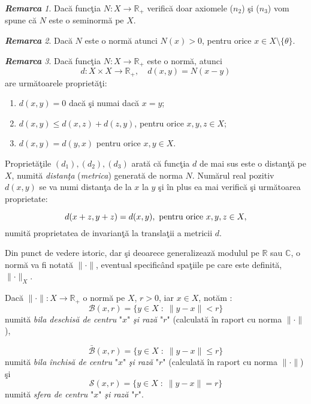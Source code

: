 \documentclass[ a4paper, 12pt]{report}
\theoremstyle{remark}
\newtheorem{remarc}{\bf Remarca}[section]
\numberwithin{equation}{section}
\begin{document}
\begin{remarc}
Dac\u a func\c tia $N : X \rightarrow \mathbb{R}_{+}$ verific\u a doar axiomele ($n_2$) \c si ($n_3$) vom spune c\u a $N$ este o seminorm\u a pe $X$.
\end{remarc}
\begin{remarc}
Dac\u a $N$ este o norm\u a atunci $N(x) > 0$, pentru orice $x \in X\setminus \{\theta\}$.
\end{remarc}
\begin{remarc}
Dac\u a func\c tia $N : X \rightarrow \mathbb{R}_{+}$ este  o norm\u a, atunci
$$d : X \times X \rightarrow \mathbb{R}_{+}, \quad
d(x,y) = N(x - y) $$ are urm\u atoarele propriet\u a\c ti:
\begin{enumerate}[($d_1$)]
\item $d(x,y) = 0$ dac\u a \c si numai dac\u a $x =y $;
\item $d(x,y) \leq d(x,z) + d(z,y)$, pentru orice $x,y,z \in X$;
\item $d(x,y) = d(y,x)$ pentru orice $x, y \in X$.
\end{enumerate}
Propriet\u a\c tile $(d_1),(d_2),(d_3)$ arat\u a c\u a func\c tia $d$ de mai sus este o distan\c t\u a pe $X$, numit\u a {\it distan\c ta} ({\it metrica}) generat\u a de norma $N$. Num\u arul real pozitiv
$d(x,y)$ se va numi distan\c ta de la $x$ la $y$ \c si \^in plus ea mai verific\u a \c si  urm\u atoarea proprietate:

$$d(x+z,y+z) = d(x,y), \hbox{ pentru orice } x,y,z \in X,$$ numit\u a proprietatea de invarian\c t\u a la transla\c tii a metricii $d$.
\end{remarc}

Din punct de vedere istoric, dar \c si deoarece  generalizeaz\u a modulul pe $\mathbb{R}$ sau $\mathbb{C}$, o norm\u a va fi notat\u a  $\lVert \cdot \rVert$, eventual specific\^and spa\c tiile pe care
este definit\u a, $\lVert \cdot \rVert_{X}$.

\smallskip

Dac\u a $\lVert \cdot \rVert : X \rightarrow \mathbb{R}_{+}$ o norm\u a pe $X$, $r>0$, iar $x \in X$, not\u am :
$$\mathcal{B}(x,r) = \{ y \in X \; : \; \lVert y-x \rVert < r\}$$
numit\u a {\it bila deschis\u a de centru} "$x$" \emph{\c si raz\u a} "$r$" (calculat\u a \^in raport cu norma $\lVert \cdot \rVert$),

$$\mathcal{\bar{B}}(x,r) = \{y \in X \; : \;  \lVert y-x \rVert \leq r\}$$
numit\u a\emph{ bila \^inchis\u a de centru} "$x$" \emph{\c si raz\u a} "$r$" (calculat\u a \^in raport cu norma $\lVert \cdot \rVert$) \c si
$$\mathcal{S}(x,r) = \{y \in X \; : \; \lVert y-x \rVert = r\}$$ numit\u a \emph{sfera de centru} "$x$" \emph{\c si raz\u a} "$r$".
\end{document}
